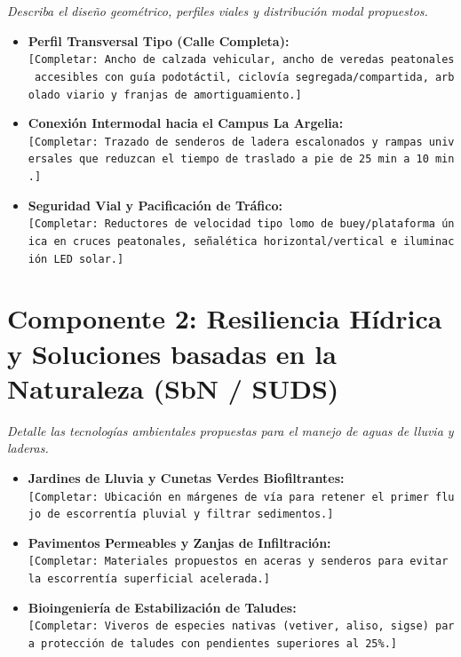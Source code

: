 \documentclass[
  letterpaper,
  DIV=11,
  numbers=noendperiod]{scrreprt}
\providecommand{\tightlist}{%
  \setlength{\itemsep}{0pt}\setlength{\parskip}{0pt}}
\begin{document}
\emph{Describa el diseño geométrico, perfiles viales y distribución
modal propuestos.}

\begin{itemize}
\tightlist
\item
  \textbf{Perfil Transversal Tipo (Calle Completa):}\\
  \texttt{{[}Completar:\ Ancho\ de\ calzada\ vehicular,\ ancho\ de\ veredas\ peatonales\ accesibles\ con\ guía\ podotáctil,\ ciclovía\ segregada/compartida,\ arbolado\ viario\ y\ franjas\ de\ amortiguamiento.{]}}
\item
  \textbf{Conexión Intermodal hacia el Campus La Argelia:}\\
  \texttt{{[}Completar:\ Trazado\ de\ senderos\ de\ ladera\ escalonados\ y\ rampas\ universales\ que\ reduzcan\ el\ tiempo\ de\ traslado\ a\ pie\ de\ 25\ min\ a\ 10\ min.{]}}
\item
  \textbf{Seguridad Vial y Pacificación de Tráfico:}\\
  \texttt{{[}Completar:\ Reductores\ de\ velocidad\ tipo\ lomo\ de\ buey/plataforma\ única\ en\ cruces\ peatonales,\ señalética\ horizontal/vertical\ e\ iluminación\ LED\ solar.{]}}
\end{itemize}

\section{Componente 2: Resiliencia Hídrica y Soluciones basadas en la
Naturaleza (SbN /
SUDS)}\label{componente-2-resiliencia-huxeddrica-y-soluciones-basadas-en-la-naturaleza-sbn-suds}

\emph{Detalle las tecnologías ambientales propuestas para el manejo de
aguas de lluvia y laderas.}

\begin{itemize}
\tightlist
\item
  \textbf{Jardines de Lluvia y Cunetas Verdes Biofiltrantes:}\\
  \texttt{{[}Completar:\ Ubicación\ en\ márgenes\ de\ vía\ para\ retener\ el\ primer\ flujo\ de\ escorrentía\ pluvial\ y\ filtrar\ sedimentos.{]}}
\item
  \textbf{Pavimentos Permeables y Zanjas de Infiltración:}\\
  \texttt{{[}Completar:\ Materiales\ propuestos\ en\ aceras\ y\ senderos\ para\ evitar\ la\ escorrentía\ superficial\ acelerada.{]}}
\item
  \textbf{Bioingeniería de Estabilización de Taludes:}\\
  \texttt{{[}Completar:\ Viveros\ de\ especies\ nativas\ (vetiver,\ aliso,\ sigse)\ para\ protección\ de\ taludes\ con\ pendientes\ superiores\ al\ 25\%.{]}}
\end{itemize}
\end{document}
